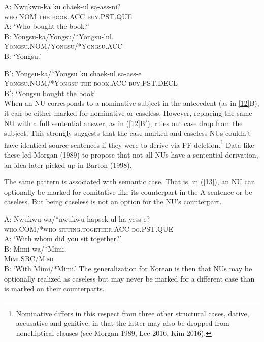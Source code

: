 \documentclass[output=paper]{langsci/langscibook}
\begin{document}
{  \ea
A: \gll Nwukwu-ka ku  chaek-ul  sa-ass-ni?\\
\textsc{who.NOM} \textsc{the} \textsc{book.ACC} \textsc{buy.PST.QUE}\\
\glt A: `Who bought the book?'\\

B: \gll Yongsu-ka/Yongsu/*Yongsu-lul.\\
\textsc{Yongsu.NOM/Yongsu/*Yongsu.ACC}\\
\glt B: `Yongsu.'

B$'$: \gll Yongsu-ka/*Yongsu  ku  chaek-ul  sa-ass-e\\
\textsc{Yongsu.NOM/*Yongsu} \textsc{the} \textsc{book.ACC} \textsc{buy.PST.DECL}\\
\glt B$'$: `Yongsu bought the book'\\
\label{12}\z
%
When an NU corresponds to a nominative subject in the antecedent (as in \ref{12}B), it can be either marked for nominative or caseless.
However, replacing the same NU with a full sentential answer, as in (\ref{12}B$'$), rules out case drop from the subject. This strongly suggests that the case-marked and caseless NUs couldn't have identical source sentences if they were to derive via PF-deletion.\footnote{Nominative differs in this respect from three other structural cases, dative, accusative and genitive, in that the latter may also be dropped from nonelliptical clauses (see Morgan 1989, Lee 2016, Kim 2016).}  Data like these led Morgan (1989) to propose that not all NUs have a sentential derivation, an idea later picked up in Barton (1998).

The same pattern is associated with semantic case. That is, in (\ref{13}), an NU can optionally be marked for comitative like its counterpart in the A-sentence or be caseless. But being caseless is not an option for the NU's counterpart.

\ea
A: \gll Nwukwu-wa/*nwukwu  hapsek-ul ha-yess-e?\\
\textsc{who.COM/*who}  \textsc{sitting.together.ACC} \textsc{do.PST.QUE}\\
\glt A: `With whom did you sit together?'\\

B: \gll Mimi-wa/*Mimi.\\
\textsc{Mimi.SRC/Mimi}\\
\glt B: `With Mimi/*Mimi.' \label{13}\z
The generalization for Korean is then that NUs may be optionally realized as caseless but may never be marked for a different case than is marked on their counterparts.

}
\end{document}
